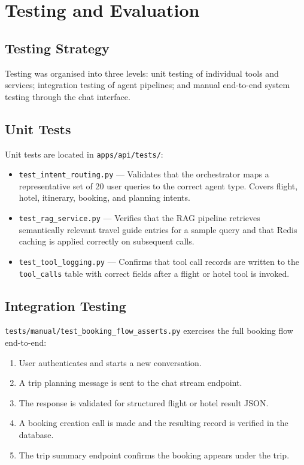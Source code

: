 \documentclass[12pt, a4paper]{article}
\begin{document}
\section{Testing and Evaluation}

\subsection{Testing Strategy}

Testing was organised into three levels: unit testing of individual tools and services; integration testing of agent pipelines; and manual end-to-end system testing through the chat interface.

\subsection{Unit Tests}

Unit tests are located in \texttt{apps/api/tests/}:

\begin{itemize}[leftmargin=1.5cm, itemsep=0.3em]
  \item \texttt{test\_intent\_routing.py} --- Validates that the orchestrator maps a representative set of 20 user queries to the correct agent type. Covers flight, hotel, itinerary, booking, and planning intents.
  \item \texttt{test\_rag\_service.py} --- Verifies that the RAG pipeline retrieves semantically relevant travel guide entries for a sample query and that Redis caching is applied correctly on subsequent calls.
  \item \texttt{test\_tool\_logging.py} --- Confirms that tool call records are written to the \texttt{tool\_calls} table with correct fields after a flight or hotel tool is invoked.
\end{itemize}

\subsection{Integration Testing}

\texttt{tests/manual/test\_booking\_flow\_asserts.py} exercises the full booking flow end-to-end:

\begin{enumerate}[leftmargin=1.5cm, itemsep=0.2em]
  \item User authenticates and starts a new conversation.
  \item A trip planning message is sent to the chat stream endpoint.
  \item The response is validated for structured flight or hotel result JSON.
  \item A booking creation call is made and the resulting record is verified in the database.
  \item The trip summary endpoint confirms the booking appears under the trip.
\end{enumerate}
\end{document}
